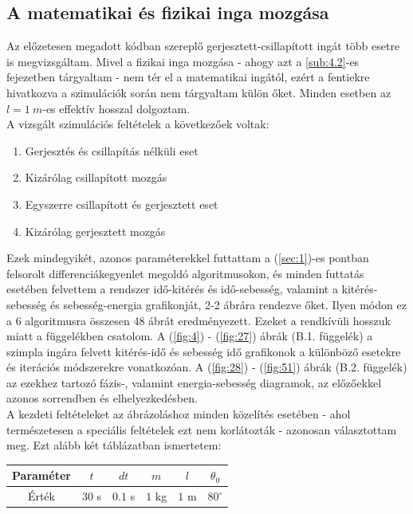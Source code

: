 \begin{multicols}{2}
\subsection{A matematikai és fizikai inga mozgása} \label{sub:4.1}
Az előzetesen megadott kódban szereplő gerjesztett-csillapított ingát több esetre is megvizsgáltam. Mivel a fizikai inga mozgása - ahogy azt a \ref{sub:4.2}-es fejezetben tárgyaltam - nem tér el a matematikai ingától, ezért a fentiekre hivatkozva a szimulációk során nem tárgyaltam külön őket. Minden esetben az $l = 1\ m$-es effektív hosszal dolgoztam. \\
A vizsgált szimulációs feltételek a következőek voltak:
\begin{enumerate}
    \item Gerjesztés és csillapítás nélküli eset
    \item Kizárólag csillapított mozgás
    \item Egyszerre csillapított és gerjesztett eset
    \item Kizárólag gerjesztett mozgás
\end{enumerate}
Ezek mindegyikét, azonos paraméterekkel futtattam a (\ref{sec:1})-es pontban felsorolt differenciákegyenlet megoldó algoritmusokon, és minden futtatás esetében felvettem a rendszer idő-kitérés és idő-sebesség, valamint a kitérés-sebesség és sebesség-energia grafikonját, 2-2 ábrára rendezve őket. Ilyen módon ez a 6 algoritmusra összesen 48 ábrát eredményezett. Ezeket a rendkívüli hosszuk miatt a  függelékben csatolom. A (\ref{fig:4}) - (\ref{fig:27}) ábrák (B.1. függelék) a szimpla ingára felvett kitérés-idő és sebesség idő grafikonok a különböző esetekre és iterációs módszerekre vonatkozóan. A (\ref{fig:28}) - (\ref{fig:51}) ábrák (B.2. függelék) az ezekhez tartozó fázis-, valamint energia-sebesség diagramok, az előzőekkel azonos sorrendben és elhelyezkedésben.
\\
A kezdeti feltételeket az ábrázoláshoz minden közelítés esetében - ahol természetesen a speciális feltételek ezt nem korlátozták - azonosan választottam meg. Ezt alább két táblázatban ismertetem:

\begin{center}
\begin{tabular}{c||c|c|c|c|c}
    \hline
    Paraméter & $t$     & $dt$     & $m$     & $l$    & $\theta_{0}$  \\ \hline
    Érték     & $30$ s  & $0.1$ s  & $1$ kg  & $1$ m  & $80^{\circ}$  \\ \hline
\end{tabular}
\end{center}
\label{tab1}


\end{multicols}
